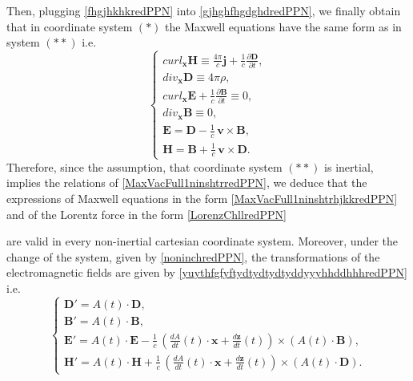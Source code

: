 \documentclass{article}
\theoremstyle{definition}
\theoremstyle{remark}
\renewcommand{\vec}[1]{\mathbf{#1}}
\newcommand{\R}{\mathbb{R}}
\newcommand{\er}{\eqref}
\newcommand{\R}{{\mathbb{R}}}
\newcommand{\er}{\eqref}
\begin{document}
Then, plugging \er{fhgjhkhkredPPN} into
\er{gjhghfhgdghdredPPN}, we finally obtain that in coordinate system
$(*)$ the Maxwell equations have the same form as in system $(**)$
i.e.
\begin{equation}\label{MaxVacFull1ninshtrhjkkredPPN}
\begin{cases}
curl_{\vec x} \vec H\equiv \frac{4\pi}{c}\vec
j+\frac{1}{c}\frac{\partial
\vec D}{\partial t},\\
div_{\vec x} \vec D\equiv 4\pi\rho,\\
curl_{\vec x} \vec E+\frac{1}{c}\frac{\partial \vec B}{\partial t}\equiv 0,\\
div_{\vec x} \vec B\equiv 0,\\
\vec E=\vec D-\frac{1}{c}\,\vec v\times \vec B,\\
\vec H=\vec B+\frac{1}{c}\,\vec v\times \vec D.
\end{cases}
\end{equation}
Therefore, since the assumption, that coordinate system $(**)$ is
inertial, implies the relations of \er{MaxVacFull1ninshtrredPPN}, we
deduce that the expressions of Maxwell equations in the form
\er{MaxVacFull1ninshtrhjkkredPPN} and of the Lorentz force in the
form \er{LorenzChllredPPN}
%
%
%
\begin{comment}
\begin{equation}\label{LorenzChlljklljk}
\vec F:=\sigma \vec E+\frac{\sigma}{c}\,\vec u\times \vec B
\end{equation}
\end{comment}
%
%
%
are valid in every non-inertial cartesian coordinate system.
Moreover, under the change of the
system, given by \er{noninchredPPN}, the transformations of the
electromagnetic fields are given by
\er{yuythfgfyftydtydtydtyddyyyhhddhhhredPPN} i.e.
\begin{equation}\label{yuythfgfyftydtydtydtyddyyyhhddhhhredPPN111hgghjg}
\begin{cases}
\vec D'=A(t)\cdot \vec D,\\
\vec B'=A(t)\cdot\vec B,\\
\vec E'=A(t)\cdot\vec E-\frac{1}{c}\,\left(\frac{dA}{dt}(t)\cdot\vec
x+\frac{d\vec z}{dt}(t)\right)\times \left(A(t)\cdot\vec B\right),\\
\vec H'=A(t)\cdot\vec H+\frac{1}{c}\,\left(\frac{dA}{dt}(t)\cdot\vec
x+\frac{d\vec z}{dt}(t)\right)\times \left(A(t)\cdot\vec D\right).
\end{cases}
\end{equation}
\end{document}
